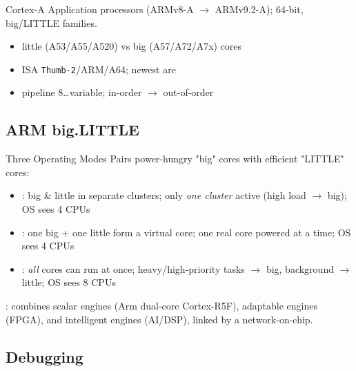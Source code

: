 \begin{definition}{Cortex-A}
    Application processors (ARMv8-A $\to$ ARMv9.2-A); 64-bit, big/LITTLE families.
    \begin{itemize}
        \item little (A53/A55/A520) vs big (A57/A72/A7x) cores
        \item ISA \texttt{Thumb-2}/ARM/A64; newest are 
        \item pipeline 8\dots variable; in-order $\to$ out-of-order
    \end{itemize}
\end{definition}

\multend

\subsection{ARM big.LITTLE}


\begin{definition}{Three Operating Modes}
    Pairs power-hungry "big" cores with efficient "LITTLE" cores:
    \begin{itemize}
        \item {}: big \& little in separate clusters;
              only \emph{one cluster} active (high load $\to$ big); OS sees 4 CPUs
        \item {}: one big + one little form a virtual
              core; one real core powered at a time; OS sees 4 CPUs
        \item {}: \emph{all} cores can run at once;
              heavy/high-priority tasks $\to$ big, background $\to$ little; OS sees 8 CPUs
    \end{itemize}
\end{definition}

\begin{remark}
    : combines scalar engines (Arm dual-core Cortex-R5F),
    adaptable engines (FPGA), and intelligent engines (AI/DSP), linked by a
    network-on-chip.
\end{remark}

\subsection{Debugging}

